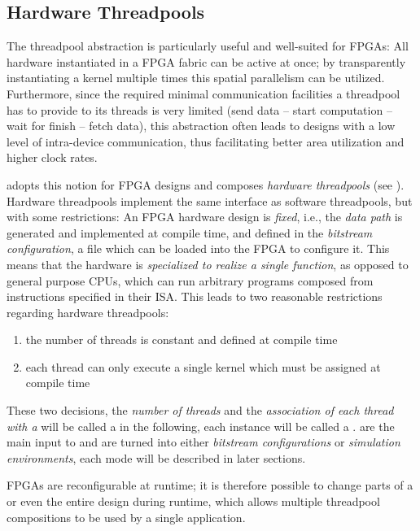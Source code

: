 \subsection*{Hardware Threadpools}
The threadpool abstraction is particularly useful and well-suited for FPGAs:
All hardware instantiated in a FPGA fabric can be active at once; by transparently instantiating a kernel multiple times this spatial parallelism can be utilized.
Furthermore, since the required minimal communication facilities a threadpool has to provide to its threads is very limited (send data -- start computation -- wait for finish -- fetch data), this abstraction often leads to designs with a low level of intra-device communication, thus facilitating better area utilization and higher clock rates.

\medskip
\tpc{} adopts this notion for FPGA designs and composes \emph{hardware threadpools} (see ).
Hardware threadpools implement the same interface as software threadpools, but with some restrictions:
An FPGA hardware design is \emph{fixed}, i.e., the \emph{data path} is generated and implemented at compile time, and defined in the \emph{bitstream configuration}, a file which can be loaded into the FPGA to configure it.
This means that the hardware is \emph{specialized to realize a single function}, as opposed to general purpose CPUs, which can run arbitrary programs composed from instructions specified in their ISA.
This leads to two reasonable restrictions regarding hardware threadpools:

\begin{enumerate}
  \item the number of threads is constant and defined at compile time
  \item each thread can only execute a single kernel which must be assigned at compile time
\end{enumerate}

These two decisions, the \emph{number of threads} and the \emph{association of each thread with a } will be called a  in the following, each  instance will be called a .
 are the main input to \tpc{} and are turned into either \emph{bitstream configurations} or \emph{simulation environments}, each mode will be described in later sections.

\medskip
\begin{note}
FPGAs are reconfigurable at runtime; it is therefore possible to change parts of a or even the entire design during runtime, which allows multiple threadpool compositions to be used by a single application.
\end{note}

